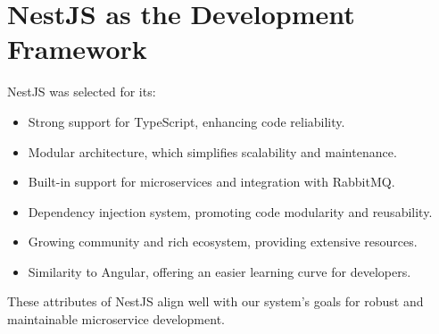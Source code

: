 \section{NestJS as the Development Framework}

NestJS was selected for its:

\begin{itemize}
    \item Strong support for TypeScript, enhancing code reliability.
    \item Modular architecture, which simplifies scalability and maintenance.
    \item Built-in support for microservices and integration with RabbitMQ.
    \item Dependency injection system, promoting code modularity and reusability.
    \item Growing community and rich ecosystem, providing extensive resources.
    \item Similarity to Angular, offering an easier learning curve for developers.
\end{itemize}

These attributes of NestJS align well with our system’s goals for robust and maintainable microservice development.

